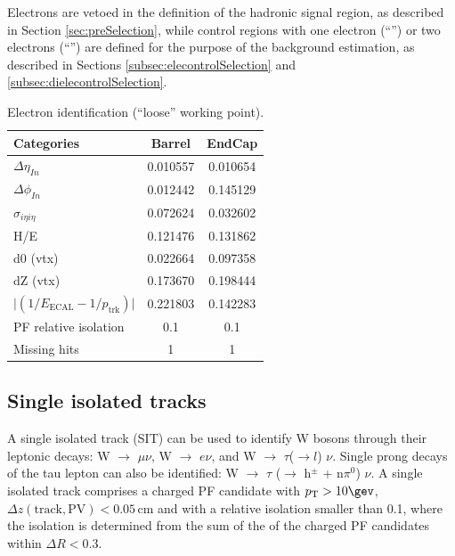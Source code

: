 Electrons are vetoed in the definition of the hadronic signal region, 
as described in Section \ref{sec:preSelection}, while 
control regions with one electron (``\ej'') or two electrons (``\eej'') are defined for the purpose of the background estimation, 
as described in Sections \ref{subsec:elecontrolSelection} and \ref{subsec:dielecontrolSelection}.


\begin{table}[h!]
  \caption{Electron identification (``loose'' working point).\label{tab:ele-id}}
  \centering
  \footnotesize
  \begin{tabular}{ lcc }
    \hline
    \hline
    Categories                                               & Barrel    & EndCap    \\
    \hline
    $\Delta \eta_{In}$                                       & 0.010557  & 0.010654  \\
    $\Delta \phi_{In}$                                       & 0.012442  & 0.145129  \\
    $\sigma_{i\eta i\eta}$                                   & 0.072624  & 0.032602  \\
    H/E                                                      & 0.121476  & 0.131862  \\
    d0 (vtx)                                                 & 0.022664  & 0.097358  \\
    dZ (vtx)                                                 & 0.173670  & 0.198444  \\
    $\lvert(1/E_{\textrm{ECAL}} - 1/p_{\textrm{trk}})\rvert$ & 0.221803  & 0.142283  \\
    PF relative isolation                                    & 0.1       & 0.1       \\
    Missing hits                                             & 1         & 1         \\
    \hline
    \hline
  \end{tabular}
  \end{table}


\subsection{Single isolated tracks}
\label{sec:SIT}

A single isolated track (SIT) can be used to identify W bosons through their leptonic decays: 
W $\rightarrow$ $\mu \nu$, W $\rightarrow$ $e\nu$, and W $\rightarrow$ $\tau$($\rightarrow l$) $\nu$. 
Single prong decays of the tau lepton can also be identified: W $\rightarrow$ $\tau$ ($\rightarrow$ h$^{\pm}$ + n$\pi^{0}$) $\nu$. 
A single isolated track comprises a charged PF candidate with $\Pt > 10 \gev$, $\Delta z(\mathrm{track}, \mathrm{PV}) < 0.05 \, \mathrm{cm}$ 
and with a relative isolation smaller than 0.1, where the isolation is determined from the sum 
of the \Pt of the charged PF candidates within $\Delta R < 0.3$.

